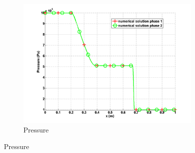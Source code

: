 \documentclass{anstrans}
\begin{document}
%
\begin{figure}[H]
        \centering
        \begin{subfigure}[b]{0.5\textwidth}
                \centering
                \includegraphics[width=\textwidth]{plots/relaxation_two_phases_pressure.png}
                \caption{Pressure}
                \label{fig:pressure}
        \end{subfigure}%
\end{figure}
\end{document}
